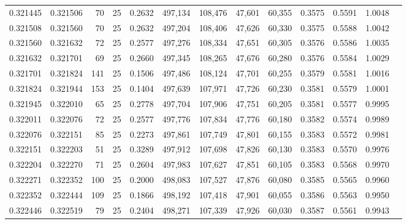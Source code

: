 \begin{tabular}{rrrrrrrrrrrrr}
0.321445 & 0.321506 &    70 &  25 &                                     0.2632 & 497,134 & 108,476 &  47,601 &  60,355 & 0.3575 & 0.5591 & 1.0048 \\
0.321508 & 0.321560 &    70 &  25 &                                     0.2632 & 497,204 & 108,406 &  47,626 &  60,330 & 0.3575 & 0.5588 & 1.0042 \\
0.321560 & 0.321632 &    72 &  25 &                                     0.2577 & 497,276 & 108,334 &  47,651 &  60,305 & 0.3576 & 0.5586 & 1.0035 \\
0.321632 & 0.321701 &    69 &  25 &                                     0.2660 & 497,345 & 108,265 &  47,676 &  60,280 & 0.3576 & 0.5584 & 1.0029 \\
0.321701 & 0.321824 &   141 &  25 &                                     0.1506 & 497,486 & 108,124 &  47,701 &  60,255 & 0.3579 & 0.5581 & 1.0016 \\
0.321824 & 0.321944 &   153 &  25 &                                     0.1404 & 497,639 & 107,971 &  47,726 &  60,230 & 0.3581 & 0.5579 & 1.0001 \\
0.321945 & 0.322010 &    65 &  25 &                                     0.2778 & 497,704 & 107,906 &  47,751 &  60,205 & 0.3581 & 0.5577 & 0.9995 \\
0.322011 & 0.322076 &    72 &  25 &                                     0.2577 & 497,776 & 107,834 &  47,776 &  60,180 & 0.3582 & 0.5574 & 0.9989 \\
0.322076 & 0.322151 &    85 &  25 &                                     0.2273 & 497,861 & 107,749 &  47,801 &  60,155 & 0.3583 & 0.5572 & 0.9981 \\
0.322151 & 0.322203 &    51 &  25 &                                     0.3289 & 497,912 & 107,698 &  47,826 &  60,130 & 0.3583 & 0.5570 & 0.9976 \\
0.322204 & 0.322270 &    71 &  25 &                                     0.2604 & 497,983 & 107,627 &  47,851 &  60,105 & 0.3583 & 0.5568 & 0.9970 \\
0.322271 & 0.322352 &   100 &  25 &                                     0.2000 & 498,083 & 107,527 &  47,876 &  60,080 & 0.3585 & 0.5565 & 0.9960 \\
0.322352 & 0.322444 &   109 &  25 &                                     0.1866 & 498,192 & 107,418 &  47,901 &  60,055 & 0.3586 & 0.5563 & 0.9950 \\
0.322446 & 0.322519 &    79 &  25 &                                     0.2404 & 498,271 & 107,339 &  47,926 &  60,030 & 0.3587 & 0.5561 & 0.9943 \\

\end{tabular}
